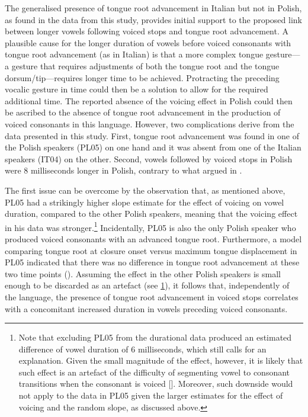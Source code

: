 \documentclass[authoryear, twocolumn]{elsarticle}
\begin{document}
The generalised presence of tongue root advancement in Italian but not
in Polish, as found in the data from this study, provides initial
support to the proposed link between longer vowels following voiced
stops and tongue root advancement. A plausible cause for the longer
duration of vowels before voiced consonants with tongue root advancement
(as in Italian) is that a more complex tongue gesture---a gesture that
requires adjustments of both the tongue root and the tongue
dorsum/tip---requires longer time to be achieved. Protracting the
preceding vocalic gesture in time could then be a solution to allow for
the required additional time. The reported absence of the voicing effect
in Polish could then be ascribed to the absence of tongue root
advancement in the production of voiced consonants in this language.
However, two complications derive from the data presented in this study.
First, tongue root advancement was found in one of the Polish speakers
(PL05) on one hand and it was absent from one of the Italian speakers
(IT04) on the other. Second, vowels followed by voiced stops in Polish
were 8 milliseconds longer in Polish, contrary to what argued in
\citet{keating1984}.

The first issue can be overcome by the observation that, as mentioned
above, PL05 had a strikingly higher slope estimate for the effect of
voicing on vowel duration, compared to the other Polish speakers,
meaning that the voicing effect in his data was
stronger.\footnote{\label{fn:polish-small} Note that excluding PL05 from the durational data produced an estimated difference of vowel duration of 6 milliseconds, which still calls for an explanation. Given the small magnitude of the effect, however, it is likely that such effect is an artefact of the difficulty of segmenting vowel to consonant transitions when the consonant is voiced []. Moreover, such downside would not apply to the data in PL05 given the larger estimates for the effect of voicing and the random slope, as discussed above.}
Incidentally, PL05 is also the only Polish speaker who produced voiced
consonants with an advanced tongue root. Furthermore, a model comparing
tongue root at closure onset versus maximum tongue displacement in PL05
indicated that there was no difference in tongue root advancement at
these two time points (). Assuming the effect in the other Polish
speakers is small enough to be discarded as an artefact (see
\cref{fn:polish-small}), it follows that, independently of the language,
the presence of tongue root advancement in voiced stops correlates with
a concomitant increased duration in vowels preceding voiced consonants.
\end{document}
